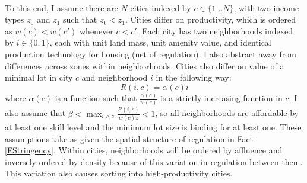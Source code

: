 \documentclass[12pt]{article}
\begin{document}
	\paragraph*{}
	To this end, I assume there are $N$ cities indexed by $c \in \{1 \dots N\}$, with two income types $z_{0}$ and $z_{1}$ such that $z_{0} < z_{1}$. Cities differ on productivity, which is ordered as $w(c) < w(c')$ whenever $c < c'$. Each city has two neighborhoods indexed by $i \in \{0,  1\}$, each with unit land mass, unit amenity value, and identical production technology for housing (net of regulation). I also abstract away from differences across zones within neighborhoods. Cities also differ on value of a minimal lot in city $c$ and neighborhood $i$ in the following way:
	\begin{equation*}
		R(i, c) = \alpha(c)i
	\end{equation*}
	where $\alpha(c)$ is a function such that $\frac{\alpha(c)}{w(c)}$ is a strictly increasing function in $c$. I also assume that $\beta < \max_{i,c, z}\frac{R(i, c)}{w(c)z} < 1$, so all neighborhoods are affordable by at least one skill level and the minimum lot size is binding for at least one. These assumptions take as given the spatial structure of regulation in Fact \ref{FStringency}. Within cities, neighborhoods will be ordered by affluence and inversely ordered by density because of this variation in regulation between them. This variation also causes sorting into high-productivity cities. 
	
\end{document}
